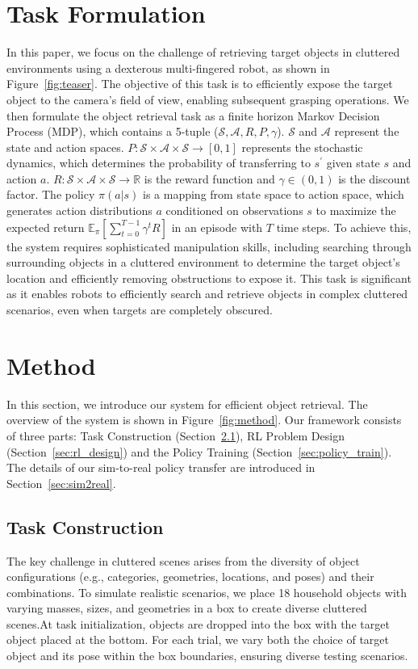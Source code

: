 \documentclass[10pt, a4paper, logo, twocolumn, copyright]{psibot} %
\begin{document}
\section{Task Formulation}
In this paper, we focus on the challenge of retrieving target objects in cluttered environments using a dexterous multi-fingered robot, as shown in Figure~\ref{fig:teaser}. The objective of this task is to efficiently expose the target object to the camera’s field of view, enabling subsequent grasping operations. We then formulate the object retrieval task as a finite horizon Markov Decision Process (MDP), which contains a 5-tuple ($\mathcal{S}, \mathcal{A}, R, P, \gamma$). $\mathcal{S}$ and $\mathcal{A}$ represent the state and action spaces. $P:\mathcal{S} \times \mathcal{A} \times \mathcal{S} \rightarrow [0, 1]$ represents the stochastic dynamics, which determines the probability of transferring to $s^\prime$ given state $s$ and action $a$. $R: \mathcal{S} \times \mathcal{A} \times \mathcal{S} \rightarrow \mathbb{R}$ is the reward function and $\gamma \in (0,1)$ is the discount factor. The policy $\pi(a|s)$ is a mapping from state space to action space, which generates action distributions $a$ conditioned on observations $s$ to maximize the expected return $\mathbb{E}_{\pi}[\sum_{t=0}^{T-1}\gamma^{t}R]$ in an episode with $T$ time steps. To achieve this, the system requires sophisticated manipulation skills, including searching through surrounding objects in a cluttered environment to determine the target object’s location and efficiently removing obstructions to expose it. This task is significant as it enables robots to efficiently search and retrieve objects in complex cluttered scenarios, even when targets are completely obscured.

\section{Method}
In this section, we introduce our system for efficient object retrieval. The overview of the system is shown in Figure~\ref{fig:method}. Our framework consists of three parts: Task Construction (Section~\ref{sec:task_con}), RL Problem Design (Section~\ref{sec:rl_design}) and the Policy Training (Section~\ref{sec:policy_train}). The details of our sim-to-real policy transfer are introduced in Section~\ref{sec:sim2real}.

\subsection{Task Construction}\label{sec:task_con}
The key challenge in cluttered scenes arises from the diversity of object configurations (e.g., categories, geometries, locations, and poses) and their combinations. To simulate realistic scenarios, we place 18 household objects with varying masses, sizes, and geometries in a box to create diverse cluttered scenes.At task initialization, objects are dropped into the box with the target object placed at the bottom. For each trial, we vary both the choice of target object and its pose within the box boundaries, ensuring diverse testing scenarios.
\end{document}
